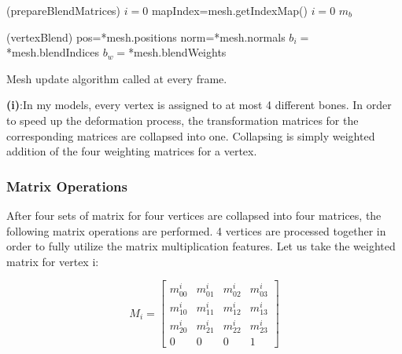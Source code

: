 \begin{algorithm}
\dontprintsemicolon %
\function(prepareBlendMatrices){
$i=0$\;
mapIndex=mesh.getIndexMap() \;
$i=0$\;
\Return $m_b$\;
}

\function(vertexBlend){
pos=*mesh.positions\;
norm=*mesh.normals\;
$b_i=$*mesh.blendIndices\;
$b_w=$*mesh.blendWeights\;
}
\caption{Mesh update algorithm called at every frame.}
\label{algo:updateMesh}
\end{algorithm}

{\bf (i)}:In my models, every vertex is assigned to at most 4 different bones.
In order to speed up the deformation process, the transformation matrices for the corresponding matrices are collapsed into one. Collapsing is simply weighted addition of the four weighting matrices for a vertex.

\subsubsection{Matrix Operations}
After four sets of matrix for four vertices are collapsed into four matrices, the following matrix operations are performed. 4 vertices are processed together in order to fully utilize the matrix multiplication features.
Let us take the weighted matrix for vertex i:

\begin{equation}
M_i=
\begin{bmatrix}
m_{00}^i & m_{01}^i & m_{02}^i & m_{03}^i \\
m_{10}^i & m_{11}^i & m_{12}^i & m_{13}^i \\
m_{20}^i & m_{21}^i & m_{22}^i & m_{23}^i \\
0 & 0 & 0 & 1
\end{bmatrix}
\label{eqn:weighted_matrix_for_i}
\end{equation}

